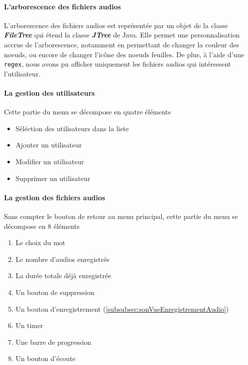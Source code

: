 \paragraph{L'arborescence des fichiers audios}

L'arborescence des fichiers audios est représentée par un objet de la classe
\textbf{\textit{FileTree}} qui étend la classe \textbf{\textit{JTree}} de Java.
Elle permet une personnalisation accrue de l'arborescence, notamment en
permettant de changer la couleur des noeuds, ou encore de changer l'icône des
noeuds feuilles. De plus, à l'aide d'une \texttt{regex}, nous avons pu afficher
uniquement les fichiers audios qui intéressent l'utilisateur.

\paragraph{La gestion des utilisateurs}
Cette partie du menu se décompose en quatre éléments
\begin{itemize}
    \item{Séléction des utilisateurs dans la liste}
    \item{Ajouter un utilisateur}
    \item{Modifier un utilisateur}
    \item{Supprimer un utilisateur}
\end{itemize}

\paragraph{La gestion des fichiers audios}

Sans compter le bouton de retour au menu principal, cette partie du menu se
décompose en 8 éléments

\begin{enumerate}
    \item{Le choix du mot}
    \item{Le nombre d'audios enregistrés}
    \item{La durée totale déjà enregistrée}
    \item{Un bouton de suppression}
    \item{Un bouton d'enregistrement} (\ref{subsubsec:sonVueEnregistrementAudio})
    \item{Un timer}
    \item{Une barre de progression}
    \item{Un bouton d'écoute}
\end{enumerate}

